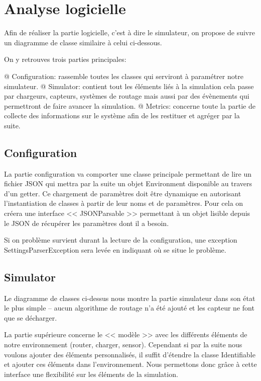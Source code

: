 \documentclass[final]{polytech/polytech}
\begin{document}
	\section{Analyse logicielle}
		Afin de réaliser la partie logicielle, c'est à dire le simulateur, on propose de suivre un diagramme de classe similaire à celui ci-dessous.
		
		
		On y retrouves trois parties principales:
		\begin{easylist}[itemize]
			@ Configuration: rassemble toutes les classes qui serviront à paramétrer notre simulateur.
			@ Simulator: contient tout les éléments liés à la simulation cela passe par chargeurs, capteurs, systèmes de routage mais aussi par des évènements qui permettront de faire avancer la simulation.
			@ Metrics: concerne toute la partie de collecte des informations sur le système afin de les restituer et agréger par la suite. 	
		\end{easylist}

		\subsection{Configuration}
			
			La partie configuration va comporter une classe principale permettant de lire un fichier JSON qui mettra par la suite un objet Environment disponible au travers d'un getter.
			Ce chargement de paramètres doit être dynamique en autorisant l'instantiation de classes à partir de leur noms et de paramètres.
			Pour cela on créera une interface << JSONParsable >> permettant à un objet lisible depuis le JSON de récupérer les paramètres dont il a besoin.
			
			Si on problème survient durant la lecture de la configuration, une exception SettingsParserException sera levée en indiquant où se situe le problème.
		
		\subsection{Simulator}
						
			Le diagramme de classes ci-dessus nous montre la partie simulateur dans son état le plus simple -- aucun algorithme de routage n'a été ajouté et les capteur ne font que se décharger.
			
			La partie supérieure concerne le << modèle >> avec les différents éléments de notre environnement (router, charger, sensor).
			Cependant si par la suite nous voulons ajouter des éléments personnalisés, il suffit d'étendre la classe Identifiable et ajouter ces éléments dans l'environnement.
			Nous permettons donc grâce à cette interface une flexibilité sur les éléments de la simulation.
			
\end{document}
